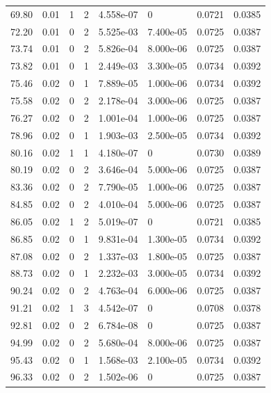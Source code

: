 \documentclass[preview]{standalone}
\begin{document}
{{{\begin{tabular}{L{1.2cm}C{1.2cm} C{0.3cm}C{0.5cm} C{1.4cm}C{1.4cm} C{1.4cm}C{1.4cm}}
  69.80  &  0.01  & 1     &  2 &  4.558e-07  & 0  & 0.0721 &  0.0385   \\ 
  72.20  &  0.01  & 0     &  2 &  5.525e-03  & 7.400e-05  & 0.0725 &  0.0387   \\ 
  73.74  &  0.01  & 0     &  2 &  5.826e-04  & 8.000e-06  & 0.0725 &  0.0387   \\ 
  73.82  &  0.01  & 0     &  1 &  2.449e-03  & 3.300e-05  & 0.0734 &  0.0392   \\ 
  75.46  &  0.02  & 0     &  1 &  7.889e-05  & 1.000e-06  & 0.0734 &  0.0392   \\ 
  75.58  &  0.02  & 0     &  2 &  2.178e-04  & 3.000e-06  & 0.0725 &  0.0387   \\ 
  76.27  &  0.02  & 0     &  2 &  1.001e-04  & 1.000e-06  & 0.0725 &  0.0387   \\ 
  78.96  &  0.02  & 0     &  1 &  1.903e-03  & 2.500e-05  & 0.0734 &  0.0392   \\ 
  80.16  &  0.02  & 1     &  1 &  4.180e-07  & 0  & 0.0730 &  0.0389   \\ 
  80.19  &  0.02  & 0     &  2 &  3.646e-04  & 5.000e-06  & 0.0725 &  0.0387   \\ 
  83.36  &  0.02  & 0     &  2 &  7.790e-05  & 1.000e-06  & 0.0725 &  0.0387   \\ 
  84.85  &  0.02  & 0     &  2 &  4.010e-04  & 5.000e-06  & 0.0725 &  0.0387   \\ 
  86.05  &  0.02  & 1     &  2 &  5.019e-07  & 0  & 0.0721 &  0.0385   \\ 
  86.85  &  0.02  & 0     &  1 &  9.831e-04  & 1.300e-05  & 0.0734 &  0.0392   \\ 
  87.08  &  0.02  & 0     &  2 &  1.337e-03  & 1.800e-05  & 0.0725 &  0.0387   \\ 
  88.73  &  0.02  & 0     &  1 &  2.232e-03  & 3.000e-05  & 0.0734 &  0.0392   \\ 
  90.24  &  0.02  & 0     &  2 &  4.763e-04  & 6.000e-06  & 0.0725 &  0.0387   \\ 
  91.21  &  0.02  & 1     &  3 &  4.542e-07  & 0  & 0.0708 &  0.0378   \\ 
  92.81  &  0.02  & 0     &  2 &  6.784e-08  & 0  & 0.0725 &  0.0387   \\ 
  94.99  &  0.02  & 0     &  2 &  5.680e-04  & 8.000e-06  & 0.0725 &  0.0387   \\ 
  95.43  &  0.02  & 0     &  1 &  1.568e-03  & 2.100e-05  & 0.0734 &  0.0392   \\ 
  96.33  &  0.02  & 0     &  2 &  1.502e-06  & 0  & 0.0725 &  0.0387   \\ 

\end{tabular}}}}
\end{document}
